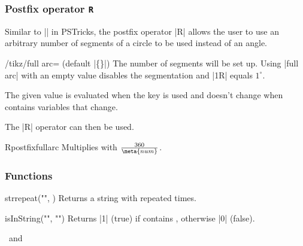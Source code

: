 \begin{multicols}{2}
\subsubsection{Postfix operator \texttt{R}}

Similar to |\segments[<num>]| in PSTricks, the postfix operator |R| allows the user
to use an arbitrary number of segments of a circle to be used instead of an angle.

\begin{key}{/tikz/full arc= (default |\{\}|)}
  The number  of segments will be set up.
  Using |full arc| with an empty value disables the segmentation and |1R| equals $1^\circ$.
  
  The given value  is evaluated when the key is used and doesn't change when
   contains variables that change.
\end{key}
The |R| operator can then be used.
\begin{math-operator}{R}{postfix}{fullarc}
  Multiplies  with $\frac{360}{\meta{num}}$.
\end{math-operator}

\subsubsection{Functions}

\begin{math-function}{strrepeat("", )}
\mathcommand
  Returns a string with  repeated  times.

\begin{codeexample}[]
\pgfmathresult
\end{codeexample}
\end{math-function}

\begin{math-function}{isInString("", "")}
\mathcommand
  Returns |1| (true) if  contains ,
  otherwise |0| (false).

\begin{codeexample}[]
\pgfmathresult \ and\ 
\pgfmathresult
\end{codeexample}
\end{math-function}


\end{multicols}
